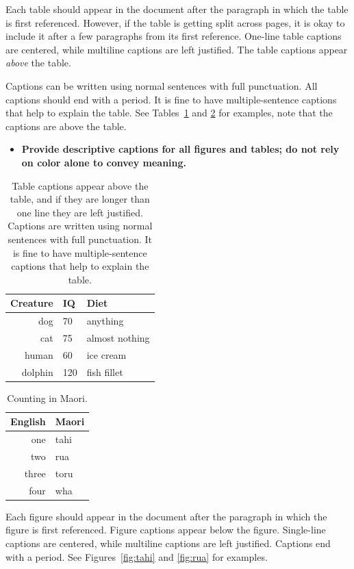 \documentclass{scspaperproc}
\theoremstyle{scsthe}
\begin{document}
Each table should appear in the document after the paragraph in which the table is first referenced. However, if the table is getting split across pages, it is okay to include it after a few paragraphs from its first reference. One-line table captions are centered, while multiline captions are left justified. The table captions appear \emph{above} the table. 

Captions can be written using normal sentences with full punctuation. All captions should end with a period. It is fine to have multiple-sentence captions that help to explain the table. See Tables~\ref{tab:first} and \ref{tab:second} for examples, note that the captions are above the table.
\begin{itemize}
  \item \textbf{Provide descriptive captions for all figures and tables; do not rely on color alone to convey meaning.}
\end{itemize}

\begin{table}[htb]
\caption{Table captions appear above the table, and if they are longer than one line they are left justified. Captions are written using normal sentences with full punctuation. It is fine to have multiple-sentence captions that help to explain the table.}\label{tab:first}
\centering
\begin{tabular}{rll}
\hline
Creature & IQ & Diet\\ \hline
dog & 70 & anything\\
cat & 75 & almost nothing\\
human & 60 & ice cream \\
dolphin & 120 & fish fillet\\
\hline
\end{tabular}
\end{table}

\begin{table}[htb]
\centering
\caption{Counting in Maori.}\label{tab:second}
\begin{tabular}{r|l}
English & Maori \\ \hline
one & tahi \\
two & rua \\
three & toru \\
four & wha \\
\end{tabular}
\end{table}

Each figure should appear in the document after the paragraph in which the figure is first referenced. Figure captions appear below the figure. Single-line captions are centered, while multiline captions are left justified. Captions end with a period. See Figures~\ref{fig:tahi} and \ref{fig:rua} for examples.
\end{document}

